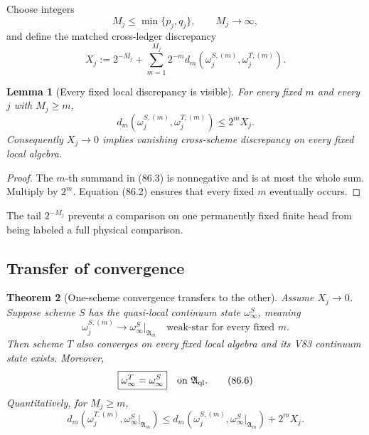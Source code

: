 \documentclass[11pt]{article}
\newtheorem{theorem}{Theorem}[section]
\newtheorem{lemma}[theorem]{Lemma}
\theoremstyle{remark}
\begin{document}
Choose integers
\[
 M_j\leq\min\{p_j,q_j\},\qquad M_j\longrightarrow\infty,     \tag{86.2}
\]
and define the matched cross-ledger discrepancy
\begin{equation}
 X_j:=
 2^{-M_j}
 +\sum_{m=1}^{M_j}2^{-m}
 d_m(\omega_j^{S,(m)},\omega_j^{T,(m)}).                    \tag{86.3}
\end{equation}

\begin{lemma}[Every fixed local discrepancy is visible]
\label{lem:v12v86-visible}
For every fixed \(m\) and every \(j\) with \(M_j\geq m\),
\begin{equation}
 d_m(\omega_j^{S,(m)},\omega_j^{T,(m)})
 \leq2^mX_j.                                                 \tag{86.4}
\end{equation}
Consequently \(X_j\to0\) implies vanishing cross-scheme discrepancy
on every fixed local algebra.
\end{lemma}

\begin{proof}
The \(m\)-th summand in (86.3) is nonnegative and is at most the
whole sum.  Multiply by \(2^m\).  Equation (86.2) ensures that every
fixed \(m\) eventually occurs.
\end{proof}

The tail \(2^{-M_j}\) prevents a comparison on one permanently fixed
finite head from being labeled a full physical comparison.

\subsection{Transfer of convergence}

\begin{theorem}[One-scheme convergence transfers to the other]
\label{thm:v12v86-transfer}
Assume \(X_j\to0\).  Suppose scheme \(S\) has the quasi-local
continuum state \(\omega_\infty^S\), meaning
\begin{equation}
 \omega_j^{S,(m)}
 \longrightarrow\omega_\infty^S|_{{\mathfrak A}_m}
 \quad\text{weak-star for every fixed }m.                   \tag{86.5}
\end{equation}
Then scheme \(T\) also converges on every fixed local algebra and
its V83 continuum state exists.  Moreover,
\begin{equation}
                              \boxed{\omega_\infty^T
                              =\omega_\infty^S}
                              \quad\text{on }{\mathfrak A}_{\rm ql}.
                                                                    \tag{86.6}
\end{equation}
Quantitatively, for \(M_j\geq m\),
\begin{equation}
 d_m(\omega_j^{T,(m)},
          \omega_\infty^S|_{{\mathfrak A}_m})
 \leq
 d_m(\omega_j^{S,(m)},
          \omega_\infty^S|_{{\mathfrak A}_m})
 +2^mX_j.                                                    \tag{86.7}
\end{equation}
\end{theorem}
\end{document}
